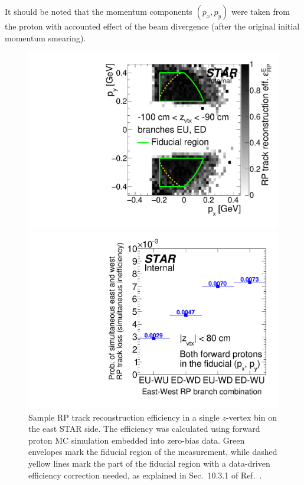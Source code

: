 It should be noted that the momentum components $(p_{x}, p_{y})$ were taken from the proton with accounted effect of the beam divergence (after the original initial momentum smearing).

\begin{figure}[ht!]%
\centering%
\begin{minipage}{.4725\textwidth}%
  \centering%
  \includegraphics[width=\linewidth,page=10]{graphics/corrections/mcFullEffPxPy.pdf}%
  \caption[Sample RP track reconstruction efficiency in a single $z$-vertex bin.]{Sample RP track reconstruction efficiency in a single $z$-vertex bin on the east STAR side. The efficiency was calculated using forward proton MC simulation embedded into zero-bias data. Green envelopes mark the fiducial region of the measurement, while dashed yellow lines mark the part of the fiducial region with a data-driven efficiency correction needed, as explained in Sec.~10.3.1 of Ref.~\cite{supplementaryNote}.}\label{fig:rpEffSample}
\end{minipage}%
\quad\quad%
\begin{minipage}{.4725\textwidth}%
  \centering
  \includegraphics[width=\linewidth]{graphics/corrections/SimultaneousEastWestRpTrackLoss.pdf}%

\end{minipage}
\end{figure}
